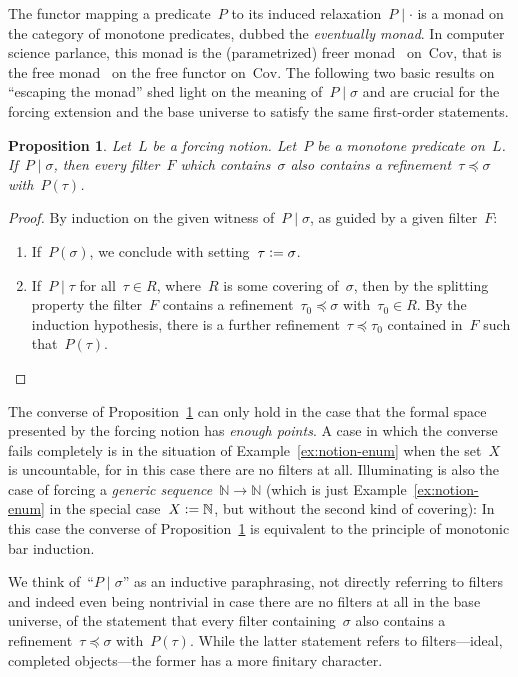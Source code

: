 \documentclass[com,11pt,crcready]{iosart2x}
\theoremstyle{definition}
\theoremstyle{plain}
\newtheorem{proposition}[definition]{Proposition}
\theoremstyle{remark}
\newcommand{\?}{\,{:}\,}
\newcommand{\NN}{\mathbb{N}}
\newcommand{\defeq}{\vcentcolon=}
\newcommand{\Cov}{\mathrm{Cov}}
\renewcommand{\_}{\mathpunct{.}\,}
\begin{document}
The functor mapping a predicate~$P$ to its induced
relaxation~$P\mid\cdot$ is a monad on the category of monotone predicates, dubbed the
\emph{eventually monad}. In computer science parlance, this monad is
the (parametrized) freer monad~\cite{kiselyov-ishii:freer,apfelmus:operational}
on~$\Cov$, that is the free monad~\cite[Section~6]{swierstra:carte}
on the free functor on~$\Cov$.
%
The following two basic results on ``escaping the monad'' shed light on the
meaning of~$P \mid \sigma$ and are crucial for the forcing extension and the
base universe to satisfy the same first-order statements.

\begin{proposition}\label{prop:ev-points}Let~$L$ be a forcing notion. Let~$P$
be a monotone predicate on~$L$. If~$P \mid \sigma$, then every filter~$F$ which
contains~$\sigma$ also contains a refinement~$\tau \preceq \sigma$
with~$P(\tau)$.
\end{proposition}

\begin{proof}By induction on the given witness of~$P \mid \sigma$, as guided by
a given filter~$F$:
\begin{enumerate}
\item If~$P(\sigma)$, we conclude with setting~$\tau \defeq \sigma$.
\item If~$P \mid \tau$ for all~$\tau \in R$, where~$R$ is some covering
of~$\sigma$, then by the splitting property the filter~$F$ contains a refinement~$\tau_0
\preceq \sigma$ with~$\tau_0 \in R$. By the induction hypothesis, there is a
further refinement~$\tau \preceq \tau_0$ contained in~$F$ such that~$P(\tau)$.\qedhere
\end{enumerate}
\end{proof}

The converse of Proposition~\ref{prop:ev-points} can only hold in the case that
the formal space presented by the forcing notion has \emph{enough points}.
A case in which the converse fails completely is in the situation of
Example~\ref{ex:notion-enum} when the set~$X$ is uncountable, for in this case
there are no filters at all. Illuminating is also the case of forcing a
\emph{generic sequence}~$\NN \to \NN$ (which is just
Example~\ref{ex:notion-enum} in the special case~$X \defeq \NN$, but without
the second kind of covering): In this case the converse of
Proposition~\ref{prop:ev-points} is equivalent to the principle of monotonic
bar induction.

We think of~``$P \mid \sigma$'' as an inductive paraphrasing, not directly referring to
filters and indeed even being nontrivial in case there are no filters at all in the base
universe, of the statement that every filter containing~$\sigma$ also contains
a refinement~$\tau \preceq \sigma$ with~$P(\tau)$. While the latter statement
refers to filters---ideal, completed objects---the former has a more finitary
character.
\end{document}
